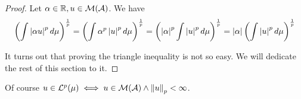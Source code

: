 \begin{proof}
	\item Let $\alpha \in \mathbb{R}, u \in \mathcal{M}(\mathcal{A})$. We have
	\begin{align*}
		\left(\int \left\vert{\alpha u}\right\vert^p d \mu\right)^{\frac{1}{p}}
		= \left(\int \alpha^p \left\vert{u}\right\vert^p d \mu\right)^{\frac{1}{p}}
		= \left(\left\vert{\alpha}\right\vert^p \int \left\vert{u}\right\vert^p d \mu\right)^{\frac{1}{p}}
		= \left\vert{\alpha}\right\vert \left(\int \left\vert{u}\right\vert^p d \mu\right)^{\frac{1}{p}}
	\end{align*}
	\item It turns out that proving the triangle inequality is not so easy. We will dedicate the rest of this section to it.
\end{proof}

\begin{remark}
	Of course $u \in \mathcal{L}^p(\mu) \iff u \in \mathcal{M}(\mathcal{A}) \land \left\Vert{u}\right\Vert_p < \infty$.
\end{remark}